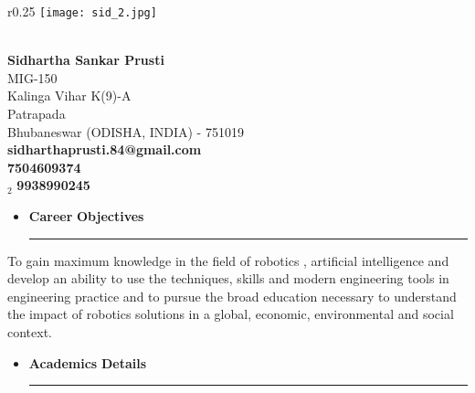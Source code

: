 \documentclass[a4paper]{article}
\newlength{\hdrheight}
\begin{document}


\begin{wrapfigure}{r}{0.25\textwidth} %
    \centering
    \texttt{[image: sid\_2.jpg]}
\end{wrapfigure}
\hspace{0.5cm}\\[-0.2cm]

\textbf{Sidhartha Sankar Prusti} \\
\indent MIG-150 \\
\indent Kalinga Vihar K(9)-A  \\
\indent Patrapada\\
\indent Bhubaneswar (ODISHA, INDIA) - 751019\\
\indent \faEnvelope \hspace{5pt}\textbf{sidharthaprusti.84@gmail.com} \\
\indent \faMobile \hspace{5pt}\textbf{7504609374} \\
\indent \faMobilePhone$_2$ \hspace{5pt}\textbf{9938990245} \\

\renewcommand{\labelitemi}{\texttt{[image: jnj.JPG]}}
\begin{itemize}
  \vspace{4ex}
  \item \textbf{\huge{C}}\textbf{\large areer} \textbf{\huge{O}}\textbf{\large bjectives}
  {\color{mypink1}
  \rule{\linewidth}{0.5mm}}
 \end{itemize}
 \justify
To  gain  maximum  knowledge  in  the  field  of  robotics
,  artificial intelligence
and 
develop  an  ability  to  use  the  techniques,  skills  and  modern  engineering  tools  in  engineering 
practice and to pursue the
broad education necessary to understand the impact of robotics 
solutions in a global, economic, environmental and social context. 

\renewcommand{\labelitemi}{\texttt{[image: jnj.JPG]}}
\begin{itemize}
  \vspace{4ex}
  \item \textbf{\huge{A}}\textbf{\large cademics} \textbf{\huge{D}}\textbf{\large etails}
  {\color{mypink1}
  \rule{10.5cm}{0.5mm}}
 \end{itemize}
 
\end{document}
